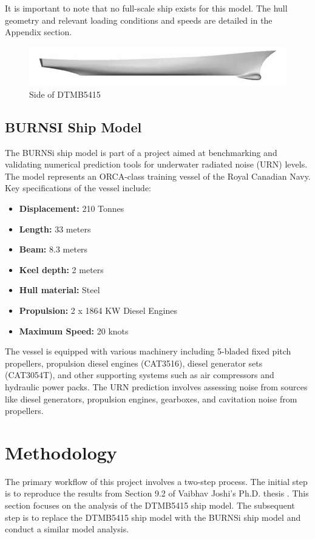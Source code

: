 \documentclass[12pt]{article} %
\begin{document}
It is important to note that no full-scale ship exists for this model. The hull geometry and relevant loading conditions and speeds are detailed in the Appendix section.
\begin{figure}[ht]
    \centering
    \includegraphics[width=1\textwidth]{DTMB.png}
    \caption{Side of DTMB5415}
\end{figure}


\subsection{BURNSI Ship Model}

The BURNSi ship model is part of a project aimed at benchmarking and validating numerical prediction tools for underwater radiated noise (URN) levels. The model represents an ORCA-class training vessel of the Royal Canadian Navy. Key specifications of the vessel include:

\begin{itemize}
    \item \textbf{Displacement:} 210 Tonnes
    \item \textbf{Length:} 33 meters
    \item \textbf{Beam:} 8.3 meters
    \item \textbf{Keel depth:} 2 meters
    \item \textbf{Hull material:} Steel
    \item \textbf{Propulsion:} 2 x 1864 KW Diesel Engines
    \item \textbf{Maximum Speed:} 20 knots
\end{itemize}

The vessel is equipped with various machinery including 5-bladed fixed pitch propellers, propulsion diesel engines (CAT3516), diesel generator sets (CAT3054T), and other supporting systems such as air compressors and hydraulic power packs. The URN prediction involves assessing noise from sources like diesel generators, propulsion engines, gearboxes, and cavitation noise from propellers.


\section{Methodology}
The primary workflow of this project involves a two-step process. The initial step is to reproduce the results from Section 9.2 of Vaibhav Joshi's Ph.D. thesis \cite{joshi2018}. This section focuses on the analysis of the DTMB5415 ship model. The subsequent step is to replace the DTMB5415 ship model with the BURNSi ship model and conduct a similar model analysis.
\end{document}

